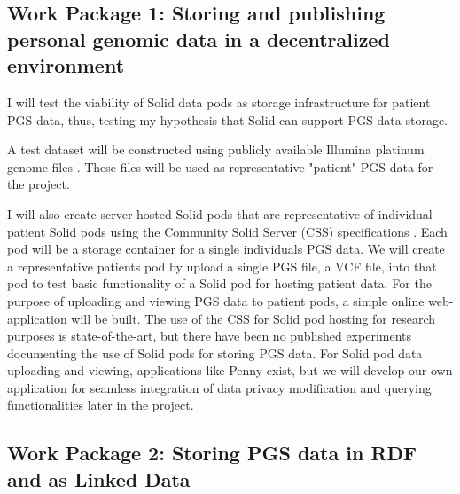 \documentclass[runningheads]{llncs}
\begin{document}

\subsection{Work Package 1: Storing and publishing personal genomic data in a decentralized environment} 

I will test the viability of Solid data pods as storage infrastructure for patient PGS data, thus, testing my hypothesis that Solid can support PGS data storage. 

A test dataset will be constructed using publicly available Illumina platinum genome files \cite{noauthor_platinum_nodate}. 
These files will be used as representative "patient" PGS data for the project. 

I will also create server-hosted Solid pods that are representative of individual patient Solid pods using the Community Solid Server (CSS) specifications  \cite{css}. 
Each pod will be a storage container for a single individual\textquotesingle s PGS data. 
We will create a representative patient\textquotesingle s pod by upload a single PGS file, a VCF file, into that pod to test basic functionality of a Solid pod for hosting patient data. 
For the purpose of uploading and viewing PGS data to patient pods, a simple online web-application will be built.
The use of the CSS for Solid pod hosting for research purposes is state-of-the-art, but there have been no published experiments documenting the use of Solid pods for storing PGS data. 
For Solid pod data uploading and viewing, applications like Penny \cite{penny} exist, but we will develop our own application for seamless integration of data privacy modification and querying functionalities later in the project. 



\subsection{Work Package 2:  Storing PGS data in RDF and as Linked Data}
\end{document}
